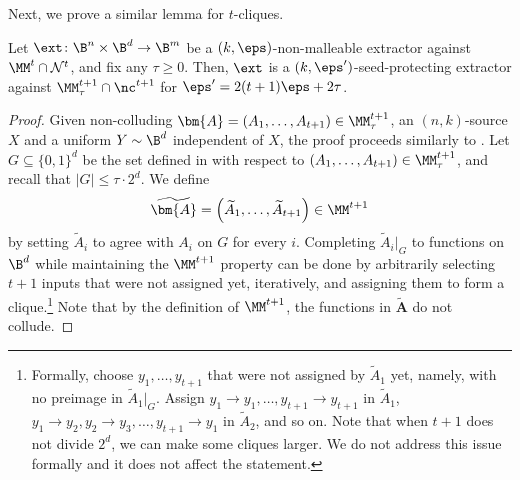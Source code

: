 Next, we prove a similar lemma for $t$-cliques. 
\begin{lemma}\label{lem:nm-to-sp2}
Let $\ext \colon \B^{n} \times \B^{d} \rightarrow \B^{m}$ be a $(k,\eps)$-non-malleable extractor
against $\MM^t \cap \mathcal{N}^{t}$, and fix any $\tau \ge 0$. Then, $\ext$ is a $(k,\eps')$-seed-protecting extractor against $\MM^{t+1}_{\tau} \cap \nc^{t+1}$ for
$\eps' = 2(t+1)\eps + 2\tau$. 
\end{lemma}
\begin{proof}
Given %
non-colluding  %
$\bm{A} = \left(A_1,\ldots,A_{t+1} \right) \in \MM_{\tau}^{t+1}$,
an $(n,k)$-source $X$ and a uniform $Y \sim \B^d$ independent of $X$,
the proof proceeds similarly to . Let $G \subseteq \{0,1\}^d$ be the set defined in  with respect to $(A_1,\ldots,A_{t+1}) \in \MM^{t+1}_{\tau}$, and recall that $|G| \le \tau \cdot 2^d$.
We define 
%
%
\[\widetilde{\bm{A}} = \left(\widetilde{A}_1,\ldots,\widetilde{A}_{t+1}\right) \in \MM^{t+1}\]
by setting $\widetilde{A}_i$ to agree with $A_i$ on $G$ for every $i$.
%
Completing $\widetilde{A}_i|_{G}$ to functions on $\B^d$ while maintaining the $\MM^{t+1}$ property can
be done by arbitrarily selecting $t+1$ inputs that were not assigned yet, iteratively, and assigning them
to form a clique.\footnote{Formally, choose $y_1,\ldots,y_{t+1}$ that
were not assigned by $\widetilde{A}_1$ yet, namely, with no preimage in $\widetilde{A}_1|_G$. 
Assign $y_1 \rightarrow y_1,\ldots,y_{t+1} \rightarrow y_{t+1}$ in $\widetilde{A}_1$, 
$y_1 \rightarrow y_2,y_2 \rightarrow y_3,\ldots,y_{t+1}\rightarrow y_{1}$ in $\widetilde{A}_2$,
and so on. Note that when $t+1$ does not divide $2^d$, we can make some cliques larger. We do not address this issue formally and it does not affect the statement.}
Note that by the definition of $\MM^{t+1}$, the functions in $\widetilde{\bm{A}}$ do not collude.  



\end{proof}

